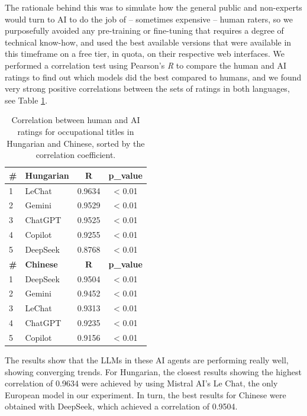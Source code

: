 \documentclass[11pt]{article}
\begin{document}
The rationale behind this was to simulate how the general public and non-experts would turn to AI to do the job of -- sometimes expensive -- human raters, so we purposefully avoided any pre-training or fine-tuning that requires a degree of technical know-how, and used the best available versions that were available in this timeframe on a free tier, in quota, on their respective web interfaces. We performed a correlation test using Pearson's \textit{R} to compare the human and AI ratings to find out which models did the best compared to humans, and we found very strong positive correlations between the sets of ratings in both languages, see Table \ref{tab:correlation}.


\begin{table}
  \caption{Correlation between human and AI ratings for occupational titles in Hungarian and Chinese, sorted by the correlation coefficient.}
  \centering
  \begin{tabular}{@{}l|l|c|c@{}}
    \textbf{\#} & \textbf{Hungarian} & \textbf{R} & \textbf{p\_value} \\
    \hline
    1 & LeChat & 0.9634 & < 0.01 \\
    2 & Gemini & 0.9529 & < 0.01 \\
    3 & ChatGPT & 0.9525 & < 0.01 \\
    4 & Copilot & 0.9255 & < 0.01 \\
    5 & DeepSeek & 0.8768 & < 0.01 \\

    \textbf{\#} & \textbf{Chinese} & \textbf{R} & \textbf{p\_value} \\
    \hline
    1 & DeepSeek & 0.9504 & < 0.01 \\
    2 & Gemini & 0.9452 & < 0.01 \\
    3 & LeChat & 0.9313 & < 0.01 \\
    4 & ChatGPT & 0.9235 & < 0.01 \\
    5 & Copilot & 0.9156 & < 0.01 \\
  \end{tabular}
  \label{tab:correlation}
\vspace{-1em}
\end{table}

The results show that the LLMs in these AI agents are performing really well, showing converging trends. For Hungarian, the closest results showing the highest correlation of 0.9634 were achieved by using Mistral AI's Le Chat, the only European model in our experiment. In turn, the best results for Chinese were obtained with DeepSeek, which achieved a correlation of 0.9504. 
\end{document}
